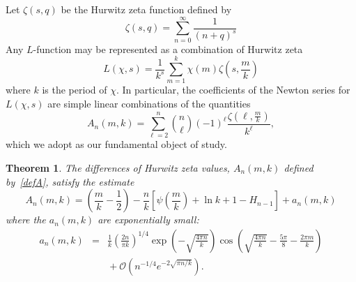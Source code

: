 \documentclass{amsart}
\def\ds{\displaystyle}
\newtheorem{theorem}{Theorem}
\begin{document}
Let $\zeta(s,q)$ be the Hurwitz
zeta function defined by
\begin{equation}\label{defhur}
\zeta(s,q)=\sum_{n=0}^{\infty}\frac{1}{(n+q)^{s}}\end{equation}
 Any $L$-function may be represented  as a combination of Hurwitz zeta
\begin{equation}
L(\chi,s)=\frac{1}{k^{s}}\sum_{m=1}^{k}\chi(m)\zeta\left(s,\frac{m}{k}\right)\label{eq:L-Hurwitz}\end{equation}
where $k$ is the period of $\chi$.
In particular, the coefficients of the Newton series  for $L(\chi,s)$ 
% 
% 
are simple linear combinations of the quantities
\begin{equation}\label{defA}
A_{n}(m,k)=\sum_{\ell=2}^{n}
\binom{n}{\ell}
(-1)^{\ell}\frac{\zeta\left(\ell,\frac{m}{k}\right)}{k^{\ell}},
\end{equation}
which we adopt as our fundamental object of study.

\begin{theorem}\label{L-thm} The differences of Hurwitz zeta values, $A_n(m,k)$
defined by~\eqref{defA}, satisfy the estimate
\begin{equation}\label{A1}
A_{n}(m,k)=\left(\frac{m}{k}-\frac{1}{2}\right)
-\frac{n}{k}\left[\psi\left(\frac{m}{k}\right)+\ln k+1-H_{n-1}\right]
+a_{n}(m,k)
\end{equation}
where the $a_n(m,k)$ are exponentially small:
\begin{equation}\label{A2}
\begin{array}{lll}
a_{n}(m,k)&=&\ds \frac{1}{k}\left(\frac{2n}{\pi k}\right)^{1/4}
\exp\left(-\sqrt{\frac{4\pi n}{k}}\right)
\cos\left(
\sqrt{\frac{4\pi n}{k}} -\frac{5\pi}{8} -\frac{2\pi m}{k} \right)
\\
&& {} \ds +\mathcal{O}\left(n^{-1/4}e^{-2\sqrt{\pi n/k}}\right).
\end{array}
\end{equation}
\end{theorem}
\end{document}

